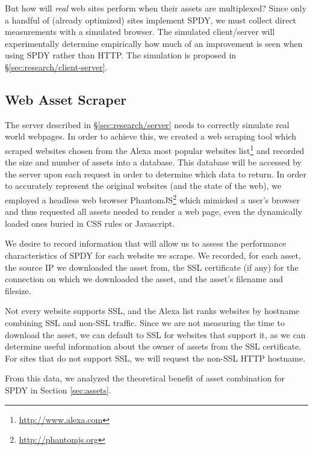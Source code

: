 \documentclass[11pt,letterpaper,notitlepage]{article}
\begin{document}
But how will \textit{real} web sites perform when their assets are multiplexed?
Since only a handful of (already optimized) sites implement SPDY, we must
collect direct measurements with a simulated browser. The simulated
client/server will experimentally determine empirically how much of an
improvement is seen when using SPDY rather than HTTP.  The simulation is
proposed in \S\ref{sec:research/client-server}.

\subsection{Web Asset Scraper}
\label{sec:research/scraper}
The server described in \S\ref{sec:research/server} needs to correctly simulate
real world webpages. In order to achieve this, we created a web scraping tool
which scraped websites chosen from the Alexa most popular websites
list\footnote{\url{http://www.alexa.com}} and recorded the size and number of
assets into a database.  This database will be accessed by the server upon each
request in order to determine which data to return.  In order to accurately
represent the original websites (and the state of the web), we employed a
headless web browser PhantomJS\footnote{\url{http://phantomjs.org}} which
mimicked a user's browser and thus requested all assets needed to render a web
page, even the dynamically loaded ones buried in CSS rules or Javascript.

We desire to record information that will allow us to assess the performance
characteristics of SPDY for each website we scrape. We recorded, for each
asset, the source IP we downloaded the asset from, the SSL certificate (if any)
for the connection on which we downloaded the asset, and the asset's filename
and filesize.

Not every website supports SSL, and the Alexa list ranks websites by hostname
combining SSL and non-SSL traffic. Since we are not measuring the time to
download the asset, we can default to SSL for websites that support it, as we
can determine useful information about the owner of assets from the SSL
certificate. For sites that do not support SSL, we will request the non-SSL
HTTP hostname.

From this data, we analyzed the theoretical benefit of asset combination for SPDY in Section \ref{sec:assets}.

\end{document}
